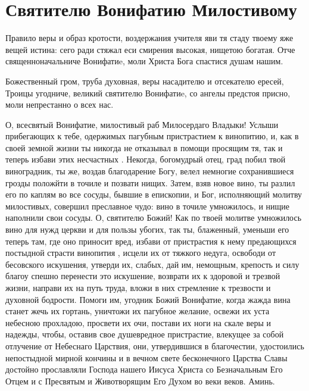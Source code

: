 \vspace{-1.5\baselineskip}\section{Святителю Вонифатию Милостивому}\begin{mymulticols}


Правило веры и образ кротости, воздержания учителя яви тя стаду твоему яже вещей истина: сего ради стяжал еси смирения высокая, нищетою богатая. Отче священноначальниче Вонифатиe, моли Христа Бога спастися душам нашим.


Божественный гром, труба духовная, веры насадителю и отсекателю ересей, Троицы угодниче, великий святителю Вонифатиe, со ангелы предстоя присно,  моли непрестанно о всех нас.


О, всесвятый Вонифатие, милостивый раб Милосердаго Владыки! Услыши прибегающих к тебе, одержимых пагубным пристрастием к винопитию, и, как в своей земной жизни ты никогда не отказывал в помощи просящим тя, так и теперь избави этих несчастных . Некогда, богомудрый отец, град побил твой виноградник, ты же, воздав благодарение Богу, велел немногие сохранившиеся грозды положйти в точиле и позвати нищих. Затем, взяв новое вино, ты разлил его по каплям во все сосуды, бывшие в епископии, и Бог, исполняющий молитву милостивых, совершил преславное чудо: вино в точиле умножилось, и нищие наполнили свои сосуды. О, святителю Божий! Как по твоей молитве умножилось вино для нужд церкви и для пользы убогих, так ты, блаженный, уменьши его теперь там, где оно приносит вред, избави от пристрастия к нему предающихся постыдной страсти винопития , исцели их от тяжкого недуга, освободи от бесовского искушения, утверди их, слабых, дай им, немощным, крепость и силу благоу спешно перенести это искушение, возврати их к здоровой и трезвой жизни, направи их на путь труда, вложи в них стремление к трезвости и духовной бодрости. Помоги им, угодник Божий Вонифатие, когда жажда вина станет жечь их гортань, уничтожи их пагубное желание, освежи их уста небесною прохладою, просвети их очи, постави их ноги на скале веры и надежды, чтобы, оставив свое душевредное пристрастие, влекущее за собой отлучение от Небеснаго Царствия, они, утвердившися в благочестии, удостоились непостыдной мирной кончины и в вечном свете бесконечного Царства Славы достойно прославляли Господа нашего Иисуса Христа со Безначальным Его Отцем и с Пресвятым и Животворящим Его Духом во веки веков. Аминь.

\end{mymulticols}


